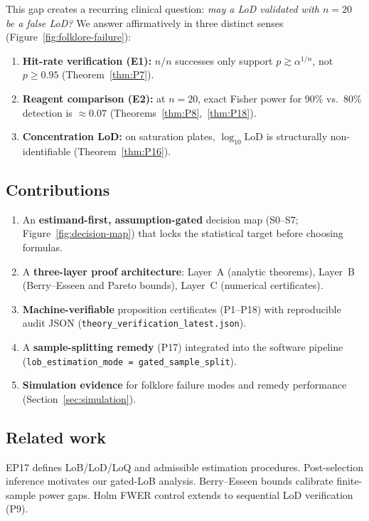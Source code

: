 \documentclass[11pt,a4paper]{article}
\theoremstyle{definition}
\begin{document}
This gap creates a recurring clinical question: \emph{may a LoD validated with
$n=20$ be a false LoD?} We answer affirmatively in three distinct senses
(Figure~\ref{fig:folklore-failure}):
\begin{enumerate}
  \item \textbf{Hit-rate verification (E1):} $n/n$ successes only support
        $p \gtrsim \alpha^{1/n}$, not $p \ge 0.95$ (Theorem~\ref{thm:P7}).
  \item \textbf{Reagent comparison (E2):} at $n=20$, exact Fisher power for
        90\% vs.\ 80\% detection is $\approx 0.07$ (Theorems~\ref{thm:P8},~\ref{thm:P18}).
  \item \textbf{Concentration LoD:} on saturation plates, $\log_{10}\mathrm{LoD}$
        is structurally non-identifiable (Theorem~\ref{thm:P16}).
\end{enumerate}

\subsection{Contributions}

\begin{enumerate}
  \item An \textbf{estimand-first, assumption-gated} decision map (S0--S7;
        Figure~\ref{fig:decision-map}) that locks the statistical target before
        choosing formulas.
  \item A \textbf{three-layer proof architecture}: Layer~A (analytic theorems),
        Layer~B (Berry--Esseen and Pareto bounds), Layer~C (numerical certificates).
  \item \textbf{Machine-verifiable} proposition certificates (P1--P18) with
        reproducible audit JSON (\texttt{theory\_verification\_latest.json}).
  \item A \textbf{sample-splitting remedy} (P17) integrated into the software
        pipeline (\texttt{lob\_estimation\_mode = gated\_sample\_split}).
  \item \textbf{Simulation evidence} for folklore failure modes and remedy performance
        (Section~\ref{sec:simulation}).
\end{enumerate}

\subsection{Related work}

EP17 \cite{ep17} defines LoB/LoD/LoQ and admissible estimation procedures.
Post-selection inference \cite{berk} motivates our gated-LoB analysis.
Berry--Esseen bounds \cite{shevtsova} calibrate finite-sample power gaps.
Holm \cite{holm} FWER control extends to sequential LoD verification (P9).
\end{document}
